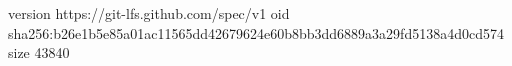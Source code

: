version https://git-lfs.github.com/spec/v1
oid sha256:b26e1b5e85a01ac11565dd42679624e60b8bb3dd6889a3a29fd5138a4d0cd574
size 43840
